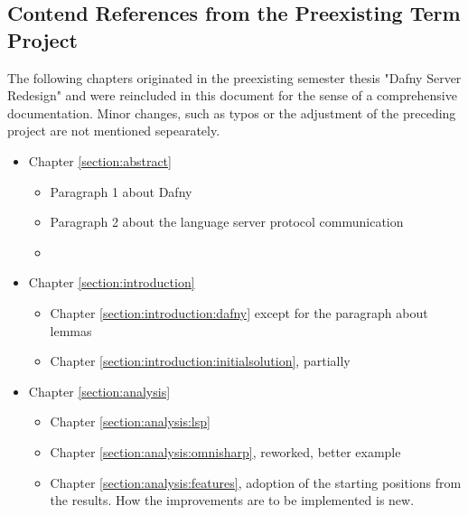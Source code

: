 \subsection{Contend References from the Preexisting Term Project}
The following chapters originated in the preexisting semester thesis "Dafny Server Redesign"\cite{sa} and were reincluded in this document for the sense of a comprehensive documentation. Minor changes, such as typos or the adjustment of the preceding project are not mentioned sepearately.


\begin{itemize}
    \item Chapter \ref{section:abstract} 
        \begin{itemize}
            \item Paragraph 1 about Dafny
            \item Paragraph 2 about the language server protocol communication
            \item  {}
        \end{itemize}
    \item Chapter \ref{section:introduction} 
        \begin{itemize}
            \item Chapter \ref{section:introduction:dafny} except for the paragraph about lemmas
            \item Chapter \ref{section:introduction:initialsolution}, partially
        \end{itemize}

    \item Chapter \ref{section:analysis} 
        \begin{itemize}
            \item Chapter \ref{section:analysis:lsp}
            \item Chapter \ref{section:analysis:omnisharp}, reworked, better example
            \item Chapter \ref{section:analysis:features}, adoption of the starting positions from the results. How the improvements are to be implemented is new.
        \end{itemize}


\end{itemize}

